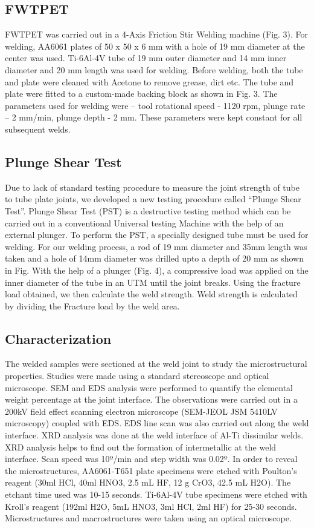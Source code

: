 \documentclass[preprint]{elsarticle}
\begin{document}
\subsection{FWTPET}
\label{subsec:FWTPET}
FWTPET was carried out in a 4-Axis Friction Stir Welding machine (Fig. 3). For welding, AA6061 plates of 50 x 50 x 6 mm with a hole of 19 mm diameter at the center was used. Ti-6Al-4V tube of 19 mm outer diameter and 14 mm inner diameter and 20 mm length was used for welding. Before welding, both the tube and plate were cleaned with Acetone to remove grease, dirt etc. The tube and plate were fitted to a custom-made backing block as shown in Fig. 3. The parameters used for welding were – tool rotational speed - 1120 rpm, plunge rate – 2 mm/min, plunge depth - 2 mm. These parameters were kept constant for all subsequent welds.

\subsection{Plunge Shear Test}
\label{subsec:Plunge Shear Test}
Due to lack of standard testing procedure to measure the joint strength of tube to tube plate joints, we developed a new testing procedure called ``Plunge Shear Test''. Plunge Shear Test (PST) is a destructive testing method which can be carried out in a conventional Universal testing Machine with the help of an external plunger. To perform the PST, a specially designed tube must be used for welding. For our welding process, a rod of 19 mm diameter and 35mm length was taken and a hole of 14mm diameter was drilled upto a depth of 20 mm as shown in Fig. With the help of a plunger (Fig. 4), a compressive load was applied on the inner diameter of the tube in an UTM until the joint breaks. Using the fracture load obtained, we then calculate the weld strength. Weld strength is calculated by dividing the Fracture load by the weld area.

\subsection{Characterization}
\label{subsec:Characterization}
The welded samples were sectioned at the weld joint to study the microstructural properties. Studies were made using a standard stereoscope and optical microscope. SEM and EDS analysis were performed to quantify the elemental weight percentage at the joint interface. The observations were carried out in a 200kV field effect scanning electron microscope (SEM-JEOL JSM 5410LV microscopy) coupled with EDS. EDS line scan was also carried out along the weld interface. XRD analysis was done at the weld interface of Al-Ti dissimilar welds. XRD analysis helps to find out the formation of intermetallic at the weld interface. Scan speed was 10º/min and step width was 0.02º. In order to reveal the microstructures, AA6061-T651 plate specimens were etched with Poulton’s reagent (30ml HCl, 40ml HNO3, 2.5 mL HF, 12 g CrO3, 42.5 mL H2O). The etchant time used was 10-15 seconds. Ti-6Al-4V tube specimens were etched with Kroll’s reagent (192ml H2O, 5mL HNO3, 3ml HCl, 2ml HF) for 25-30 seconds. Microstructures and macrostructures were taken using an optical microscope.
\end{document}
